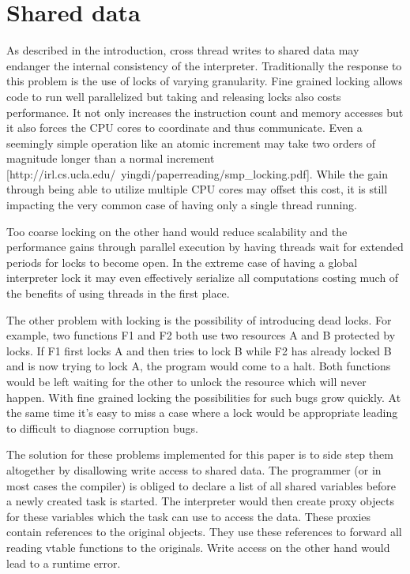 \documentclass[bachelor,english]{hgbthesis}
\begin{document}
\section{Shared data}

As described in the introduction, cross thread writes to shared data may endanger the internal consistency of the interpreter. Traditionally the response to this problem is the use of locks of varying granularity. Fine grained locking allows code to run well parallelized but taking and releasing locks also costs performance. It not only increases the instruction count and memory accesses but it also forces the CPU cores to coordinate and thus communicate. Even a seemingly simple operation like an atomic increment may take two orders of magnitude longer than a normal increment [http://irl.cs.ucla.edu/~yingdi/paperreading/smp\_locking.pdf]. While the gain through being able to utilize multiple CPU cores may offset this cost, it is still impacting the very common case of having only a single thread running.

Too coarse locking on the other hand would reduce scalability and the performance gains through parallel execution by having threads wait for extended periods for locks to become open. In the extreme case of having a global interpreter lock it may even effectively serialize all computations costing much of the benefits of using threads in the first place.

The other problem with locking is the possibility of introducing dead locks. For example, two functions F1 and F2 both use two resources A and B protected by locks. If F1 first locks A and then tries to lock B while F2 has already locked B and is now trying to lock A, the program would come to a halt. Both functions would be left waiting for the other to unlock the resource which will never happen. With fine grained locking the possibilities for such bugs grow quickly. At the same time it's easy to miss a case where a lock would be appropriate leading to difficult to diagnose corruption bugs.

The solution for these problems implemented for this paper is to side step them altogether by disallowing write access to shared data. The programmer (or in most cases the compiler) is obliged to declare a list of all shared variables before a newly created task is started. The interpreter would then create proxy objects for these variables which the task can use to access the data. These proxies contain references to the original objects. They use these references to forward all reading vtable functions to the originals. Write access on the other hand would lead to a runtime error.
\end{document}
